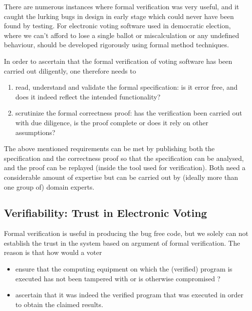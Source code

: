    There are numerous instances where formal verification 
	was very useful, and it caught the lurking bugs in design in early 
	stage which could never have been found by testing. For 
	electronic voting software used in democratic election, where we 
	can't afford to lose a single ballot or miscalculation 
	or any undefined behaviour, should be developed 
	rigorously using formal method techniques. 
	
	In order to ascertain that the formal verification of voting software has been 
	carried out diligently, one therefore needs to
	\begin{enumerate}
	\item read, understand and validate the formal specification: is it 
	error free, and does it indeed reflect the intended functionality?
	\item scrutinize the formal correctness proof: has the verification
	been carried out with due diligence, is the proof complete or does
	it rely on other assumptions?
	
	\end{enumerate}			
	
	\noindent
	The above mentioned requirements can be met by publishing both the
	specification and the correctness proof so that the specification
	can be analysed, and the proof can be replayed (inside the tool used for 
	verification). Both need a
	considerable amount of expertise but can be carried out by (ideally
	more than one group of) domain experts.
	

	
	  
	 
		
 \subsection{Verifiability: Trust in Electronic Voting}
  Formal verification is useful in producing the 
   bug free code, but we solely can not 
   establish the trust in the system based on argument of 
   formal verification. The reason is that how would a voter
   \begin{itemize}
   \item ensure that the computing equipment on which the (verified)
	program is executed has not been tampered with or is otherwise
	compromised ?
	\item ascertain that it was indeed the verified program that was
	executed in order to obtain the claimed results.
   \end{itemize}
   
